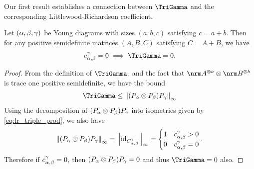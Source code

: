 \documentclass[notitlepage, 10pt]{article}
\begin{document}
Our first result establishes a connection between $\TriGamma$ and the corresponding Littlewood-Richardson coefficient.
\begin{cor}
    \label{cor:tri_indep_upper_bound}
    Let $(\alpha,\beta,\gamma)$ be Young diagrams with sizes $(a,b,c)$ satisfying $c=a+b$.
    Then for any positive semidefinite matrices $(A,B,C)$ satisfying $C=A+B$, we have
    \begin{equation}
        \label{eq:tri_gamma_lr_upper_bound}
        c^{\yc}_{\ya,\yb} = 0 \implies \TriGamma = 0.
    \end{equation}
\end{cor}
\begin{proof}
    From the definition of $\TriGamma$, and the fact that $\nrm A^{\ot a} \ot \nrm B^{\ot b}$ is trace one positive semidefinite, we have the bound
    \begin{equation}
        \TriGamma \leq \norm{(P_{\ya} \ot P_{\yb})P_{\yc}}_{\infty}
    \end{equation}
    Using the decomposition of $(P_{\alpha} \otimes P_{\beta})P_{\gamma}$ into isometries given by \cref{eq:lr_triple_prod}, we also have
    \begin{equation}
        \left\lVert(P_{\alpha} \otimes P_{\beta})P_{\gamma}\right\rVert_{\infty} = \left\lVert\operatorname{id}_{C^{\gamma}_{\alpha,\beta}}\right\rVert_{\infty} = \begin{cases} 1 & c^{\gamma}_{\alpha,\beta} > 0 \\ 0 & c^{\gamma}_{\alpha,\beta} = 0 \end{cases}.
    \end{equation}
    Therefore if $c^{\gamma}_{\alpha,\beta} = 0$, then $(P_{\alpha} \otimes P_{\beta})P_{\gamma} = 0$ and thus $\TriGamma = 0$ also.
\end{proof}
\end{document}
